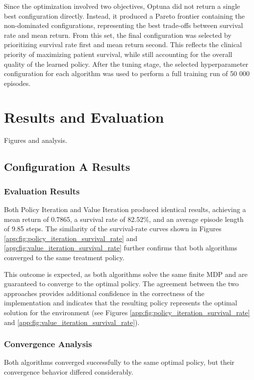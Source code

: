 \documentclass[11pt,a4paper]{article}
\begin{document}
Since the optimization involved two objectives, Optuna did not return a single best configuration directly. 
Instead, it produced a Pareto frontier containing the non-dominated configurations, 
representing the best trade-offs between survival rate and mean return. 
From this set, the final configuration was selected by prioritizing survival rate first and mean return second. 
This reflects the clinical priority of maximizing patient survival, 
while still accounting for the overall quality of the learned policy. 
After the tuning stage, the selected hyperparameter configuration for each algorithm was used to perform a full training run of 50 000 episodes.


\section{Results and Evaluation}
Figures and analysis.

\subsection{Configuration A Results}
\subsubsection{Evaluation Results}

Both Policy Iteration and Value Iteration produced identical results, achieving a mean return of 0.7865, a survival rate of 82.52\%, 
and an average episode length of 9.85 steps. 
The similarity of the survival-rate curves shown in Figures \ref{app:fig:policy_iteration_survival_rate} 
and \ref{app:fig:value_iteration_survival_rate} 
further confirms that both algorithms converged to the same treatment policy.

This outcome is expected, as both algorithms solve the same finite MDP and are guaranteed to converge to the optimal policy. 
The agreement between the two approaches provides additional confidence in the correctness of the implementation and indicates 
that the resulting policy represents the optimal solution for the environment (see Figures \ref{app:fig:policy_iteration_survival_rate} and \ref{app:fig:value_iteration_survival_rate}).

\subsubsection{Convergence Analysis}

Both algorithms converged successfully to the same optimal policy, but their convergence behavior differed considerably. 
\end{document}

